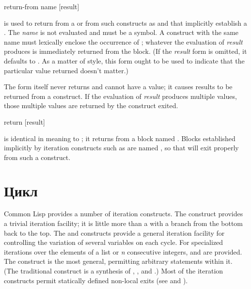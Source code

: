 \begin{defspec}
return-from name [result]

is used to return from a  or from such constructs
as  and  that implicitly establish a .
The \emph{name} is not evaluated and must be a symbol.
A  construct with the same name must lexically
enclose the occurrence of ;
whatever the evaluation of \emph{result} produces
is immediately returned from the block.
(If the \emph{result} form is omitted, it defaults to {\nil}.
As a matter of style, this form ought to be used to indicate that
the particular value returned doesn't matter.)

The  form itself never returns and cannot have a value;
it causes results to be returned from a  construct.
If the evaluation of \emph{result} produces multiple values,
those multiple values are returned by the construct exited.
\end{defspec}

\begin{defmac}
return [result]

 is identical in meaning
to ; it returns from a block named {\nil}.
Blocks established implicitly by iteration constructs such
as  are named {\nil}, so that  will exit properly from
such a construct.
\end{defmac}

\section{Цикл}

Common Lisp provides a number of iteration constructs.  The 
construct provides a trivial iteration facility; it is little more
than a  with a branch from the bottom back to the top.
The 
and  constructs provide a general iteration facility
for controlling the variation of several variables on each cycle.
For specialized iterations
over the elements of a list or \emph{n} consecutive integers,  and
 are provided.  The  construct is the most
general, permitting arbitrary  statements within it.  (The
traditional  construct is a synthesis of ,
, and .)
Most of the iteration constructs permit statically defined non-local exits
(see  and ).

